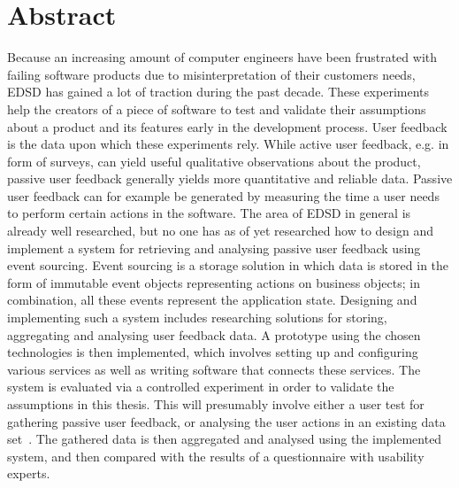 %
\chapter*{Abstract}
\label{sec:abstract}
\vspace*{-10mm}

Because an increasing amount of computer engineers have been frustrated with failing software products due to misinterpretation of their customers needs, \ac{EDSD} has gained a lot of traction during the past decade.
These experiments help the creators of a piece of software to test and validate their assumptions about a product and its features early in the development process.
User feedback is the data upon which these experiments rely.
While active user feedback, e.g. in form of surveys, can yield useful qualitative observations about the product, passive user feedback generally yields more quantitative and reliable data.
Passive user feedback can for example be generated by measuring the time a user needs to perform certain actions in the software.
The area of \acl{EDSD} in general is already well researched, but no one has as of yet researched how to design and implement a system for retrieving and analysing passive user feedback using event sourcing.
Event sourcing is a storage solution in which data is stored in the form of immutable event objects representing actions on business objects; in combination, all these events represent the application state.
Designing and implementing such a system includes researching solutions for storing, aggregating and analysing user feedback data.
A prototype using the chosen technologies is then implemented, which involves setting up and configuring various services as well as writing software that connects these services.
The system is evaluated via a controlled experiment in order to validate the assumptions in this thesis.
This will presumably involve either a user test for gathering passive user feedback, or analysing the user actions in an existing data set~\cite{Deka:2017:Rico}.
The gathered data is then aggregated and analysed using the implemented system, and then compared with the results of a questionnaire with usability experts.
